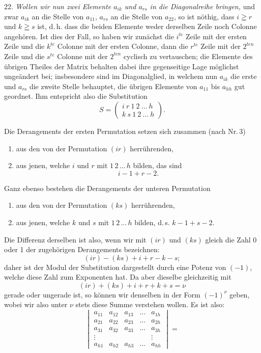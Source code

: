 22. \textit{Wollen wir nun zwei Elemente $a_{ik}$ und $a_{rs}$ in die Diagonalreihe
bringen,} und zwar $a_{ik}$ an die Stelle von $a_{11}$, $a_{rs}$ an die Stelle von
$a_{22}$, so ist n\"othig, dass $i \geqq r$ und $k \geqq s$ ist, d.\,h. dass die beiden
Elemente weder derselben Zeile noch Colonne angeh\"oren. Ist dies der Fall, so haben
wir zun\"achst die $i^{te}$ Zeile mit der ersten Zeile und die $k^{te}$ Colonne mit
der ersten Colonne, dann die $r^{te}$ Zeile mit der $2^{ten}$ Zeile und die $s^{te}$
Colonne mit der $2^{ten}$ cyclisch zu vertauschen; die Elemente des \"ubrigen Theiles
der Matrix behalten dabei ihre gegenseitige Lage m\"oglichst unge\"andert bei;
insbesondere sind im Diagonalglied, in welchem nun $a_{ik}$ die erste und $a_{rs}$
die zweite Stelle behauptet, die \"ubrigen Elemente von $a_{11}$ bis $a_{hh}$ gut
geordnet. Ihm entspricht also die Substitution
\[
S = \begin{pmatrix} i\ r\ 1\ 2\ \dots\ h \\ k\ s\ 1\ 2\ \dots\ h \end{pmatrix}.
\]

Die Derangements der ersten Permutation setzen sich zusammen (nach Nr.\,3)
\begin{enumerate}
\item[1)] aus den von der Permutation $(ir)$ herr\"uhrenden,
\item[2)] aus jenen, welche $i$ und $r$ mit $1\,2\,\dots\,h$ bilden, das sind
\[
i - 1 + r - 2.
\]
\end{enumerate}
Ganz ebenso bestehen die Derangements der unteren Permutation
\begin{enumerate}
\item[1)] aus den von der Permutation $(ks)$ herr\"uhrenden,
\item[2)] aus jenen, welche $k$ und $s$ mit $1\,2\,\dots\,h$ bilden, d.\,s.
$k - 1 + s - 2$.
\end{enumerate}
Die Differenz derselben ist also, wenn wir mit $(ir)$ und $(ks)$ gleich die Zahl
0 oder 1 der zugeh\"origen Derangements bezeichnen:
\[
(ir) - (ks) + i + r - k - s;
\]
daher ist der Modul der Substitution dargestellt durch eine Potenz von $(-1)$,
welche diese Zahl zum Exponenten hat. Da aber dieselbe gleichzeitig mit
\[
(ir) + (ks) + i + r + k + s = \nu
\]
gerade oder ungerade ist, so k\"onnen wir denselben in der Form $(-1)^{\nu}$
geben, wobei wir also unter $\nu$ stets diese Summe verstehen wollen. Es ist also:
\[
\begin{vmatrix}
a_{11} & a_{12} & a_{13} & \dots & a_{1h} \\
a_{21} & a_{22} & a_{23} & \dots & a_{2h} \\
a_{31} & a_{32} & a_{33} & \dots & a_{3h} \\
\vdots & & & & \vdots \\
a_{h1} & a_{h2} & a_{h3} & \dots & a_{hh}
\end{vmatrix}
=
\]


